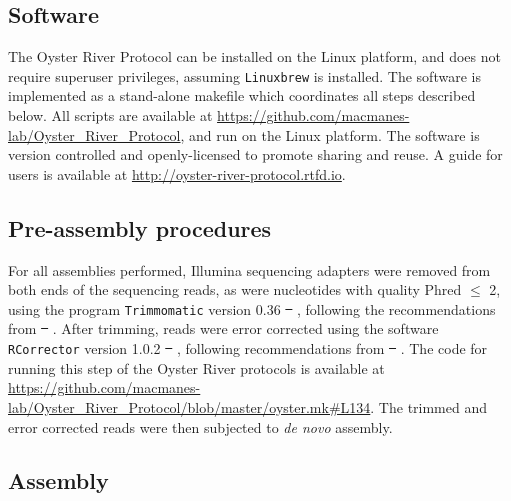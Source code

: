 \documentclass[10pt,letterpaper]{article}
\providecommand{\DIFaddtex}[1]{{\protect\color{blue}\uwave{#1}}} %
\providecommand{\DIFdeltex}[1]{{\protect\color{red}\sout{#1}}}                      %
\providecommand{\DIFaddbegin}{} %
\providecommand{\DIFaddend}{} %
\providecommand{\DIFdelbegin}{} %
\providecommand{\DIFdelend}{} %
\providecommand{\DIFadd}[1]{\texorpdfstring{\DIFaddtex{#1}}{#1}} %
\providecommand{\DIFdel}[1]{\texorpdfstring{\DIFdeltex{#1}}{}} %
\newcommand{\DIFscaledelfig}{0.5}
\newlength{\DIFdelgraphicswidth} %
\newlength{\DIFdelgraphicsheight} %
\newcommand{\DIFaddincludegraphics}[2][]{{\color{blue}\fbox{\DIFOincludegraphics[#1]{#2}}}} %
\newcommand{\DIFdelincludegraphics}[2][]{%
\sbox{\DIFdelgraphicsbox}{\DIFOincludegraphics[#1]{#2}}%
\settoboxwidth{\DIFdelgraphicswidth}{\DIFdelgraphicsbox} %
\settoboxtotalheight{\DIFdelgraphicsheight}{\DIFdelgraphicsbox} %
\scalebox{\DIFscaledelfig}{%
\parbox[b]{\DIFdelgraphicswidth}{\usebox{\DIFdelgraphicsbox}\\[-\baselineskip] \rule{\DIFdelgraphicswidth}{0em}}\llap{\resizebox{\DIFdelgraphicswidth}{\DIFdelgraphicsheight}{%
\setlength{\unitlength}{\DIFdelgraphicswidth}%
\begin{picture}(1,1)%
\thicklines\linethickness{2pt} %
{\color[rgb]{1,0,0}\put(0,0){\framebox(1,1){}}}%
{\color[rgb]{1,0,0}\put(0,0){\line( 1,1){1}}}%
{\color[rgb]{1,0,0}\put(0,1){\line(1,-1){1}}}%
\end{picture}%
}\hspace*{3pt}}} %
} %
\DeclareRobustCommand{\DIFaddbegin}{\DIFOaddbegin \let\includegraphics\DIFaddincludegraphics} %
\DeclareRobustCommand{\DIFaddend}{\DIFOaddend \let\includegraphics\DIFOincludegraphics} %
\DeclareRobustCommand{\DIFdelbegin}{\DIFOdelbegin \let\includegraphics\DIFdelincludegraphics} %
\DeclareRobustCommand{\DIFdelend}{\DIFOaddend \let\includegraphics\DIFOincludegraphics} %
\begin{document}
\subsection{Software}

The Oyster River Protocol can be installed on the Linux platform, and does not require superuser privileges, assuming \texttt{Linuxbrew} \citep{Jackman:2016bx} is installed. The software is implemented as a stand-alone makefile which coordinates all steps described below. All scripts are available at \url{https://github.com/macmanes-lab/Oyster_River_Protocol}, and run on the Linux platform. The software is version controlled and openly-licensed to promote sharing and reuse. A guide for users is available at \url{http://oyster-river-protocol.rtfd.io}. 


\subsection{Pre-assembly procedures}

For all assemblies performed, Illumina sequencing adapters were removed from both ends of the sequencing reads, as were nucleotides with quality Phred $\leq$ 2, using the program \texttt{Trimmomatic} version 0.36 \DIFdelbegin \DIFdel{\mbox{%
\cite{Bolger:2014ek}}%
}\DIFdelend \DIFaddbegin \DIFadd{\mbox{%
\citep{Bolger:2014ek}}%
}\DIFaddend , following the recommendations from \DIFdelbegin \DIFdel{\mbox{%
\cite{MacManes:2014io}}%
}\DIFdelend \DIFaddbegin \DIFadd{\mbox{%
\citep{MacManes:2014io}}%
}\DIFaddend . After trimming, reads were error corrected using the software \texttt{RCorrector} version 1.0.2 \DIFdelbegin \DIFdel{\mbox{%
\cite{Song:2015in}}%
}\DIFdelend \DIFaddbegin \DIFadd{\mbox{%
\citep{Song:2015in}}%
}\DIFaddend , following recommendations from \DIFdelbegin \DIFdel{\mbox{%
\cite{MacManes:2013ec}}%
}\DIFdelend \DIFaddbegin \DIFadd{\mbox{%
\citep{MacManes:2013ec}}%
}\DIFaddend . The code for running this step of the Oyster River protocols is available at \url{https://github.com/macmanes-lab/Oyster_River_Protocol/blob/master/oyster.mk#L134}. The trimmed and error corrected reads were then subjected to \textit{de novo} assembly. 


\subsection{Assembly}
\end{document}
